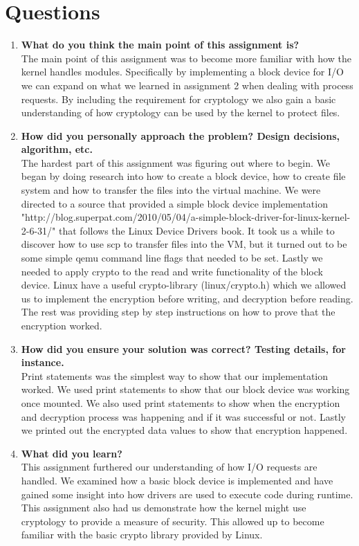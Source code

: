 \documentclass[onecolumn, draftclsnofoot,10pt, compsoc]{IEEEtran}
\begin{document}
\section{Questions}
\begin{enumerate}
\item \textbf{What do you think the main point of this assignment is?}
\\	The main point of this assignment was to become more familiar with how the kernel handles modules. Specifically by implementing a block device for I/O we can expand on what we learned in assignment 2 when dealing with process requests. By including the requirement for cryptology we also gain a basic understanding of how cryptology can be used by the kernel to protect files. 

\item \textbf{How did you personally approach the problem? Design decisions, algorithm, etc.}
\\ The hardest part of this assignment was figuring out where to begin. We began by doing research into how to create a block device, how to create file system and how to transfer the files into the virtual machine. We were directed to a source that provided a simple block device implementation "http://blog.superpat.com/2010/05/04/a-simple-block-driver-for-linux-kernel-2-6-31/" that follows the Linux Device Drivers book. It took us a while to discover how to use scp to transfer files into the VM, but it turned out to be some simple qemu command line flags that needed to be set. Lastly we needed to apply crypto to the read and write functionality of the block device. Linux have a useful crypto-library (linux/crypto.h) which we allowed us to implement the encryption before writing, and decryption before reading. The rest was providing step by step instructions on how to prove that the encryption worked.   

\item \textbf{How did you ensure your solution was correct? Testing details, for instance.}
\\ Print statements was the simplest way to show that our implementation worked. We used print statements to show that our block device was working once mounted. We also used print statements to show when the encryption and decryption process was happening and if it was successful or not. Lastly we printed out the encrypted data values to show that encryption happened.  

\item \textbf{What did you learn?}
\\ This assignment furthered our understanding of how I/O requests are handled. We examined how a basic block device is implemented and have gained some insight into how drivers are used to execute code during runtime. This assignment also had us demonstrate how the kernel might use cryptology to provide a measure of security. This allowed up to become familiar with the basic crypto library provided by Linux. 


\end{enumerate}
\end{document}
